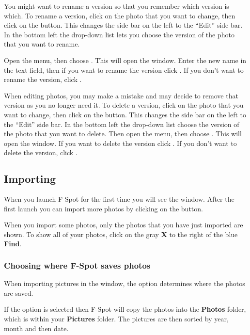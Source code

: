You might want to rename a version so that you remember which version is which.
 To rename a version, click on the photo that you want to change, then click on 
the  button. This changes the side bar on the left to the 
``Edit'' side bar. In the bottom left the  drop-down list lets 
you choose the version of the photo that you want to rename. 

Open the  menu, then choose . This will open the 
 window. Enter the new name in the  
text field, then if you want to rename the version click . If you don't 
want to rename the version, click .

When editing photos, you may make a mistake and may decide to remove that version
as you no longer need it. To delete a version, click on the photo that you want 
to change, then click on the  button. This changes the side 
bar on the left to the ``Edit'' side bar. In the bottom left the 
 drop-down list choose the version of the photo that you want 
to delete. Then open the  menu, then choose . 
This will open the  window. If you want to delete the 
version click . If you don't want to delete the version, click 
.

\subsection{Importing}

When you launch F-Spot for the first time you will see the  window.
After the first launch you can import more photos by clicking on the 
 button. 

When you import some photos, only the photos that you have just imported are 
shown. To show all of your photos, click on the gray \textbf{X} to the right 
of the blue \textbf{Find}.

\subsubsection{Choosing where F-Spot saves photos}

When importing pictures in the  window, the 
 option determines where the photos 
are saved. 

If the  option is selected then F-Spot 
will copy the photos into the \textbf{Photos} folder, which is within your 
\textbf{Pictures} folder. The pictures are then sorted by year, month and then 
date.

